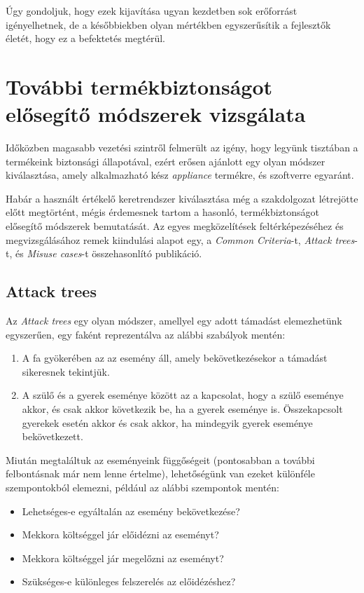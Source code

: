 Úgy gondoljuk, hogy ezek kijavítása ugyan kezdetben sok erőforrást igényelhetnek, de a későbbiekben
olyan mértékben egyszerűsítik a fejlesztők életét, hogy ez a befektetés megtérül.

\section{További termékbiztonságot elősegítő módszerek vizsgálata}

Időközben magasabb vezetési szintről felmerült az igény, hogy legyünk tisztában a termékeink
biztonsági állapotával, ezért erősen ajánlott egy olyan módszer kiválasztása, amely alkalmazható
kész \emph{appliance} termékre, és szoftverre egyaránt.

Habár a használt értékelő keretrendszer kiválasztása még a szakdolgozat létrejötte előtt megtörtént,
mégis érdemesnek tartom a hasonló, termékbiztonságot elősegítő módszerek bemutatását. Az egyes
megközelítések feltérképezéséhez és megvizsgálásához remek kiindulási alapot egy, a \emph{Common
Criteria}-t, \emph{Attack trees}-t, és \emph{Misuse cases}-t összehasonlító publikáció.
\cite{ThreeApproaches}

\subsection{Attack trees}

Az \emph{Attack trees}\cite{schneier1999attack} egy olyan módszer, amellyel egy adott támadást
elemezhetünk egyszerűen, egy faként reprezentálva az alábbi szabályok mentén:
\begin{enumerate}
    \item A fa gyökerében az az esemény áll, amely bekövetkezésekor a támadást sikeresnek tekintjük.
    \item A szülő és a gyerek eseménye között az a kapcsolat, hogy a szülő eseménye akkor, és csak
        akkor következik be, ha a gyerek eseménye is.  Összekapcsolt gyerekek esetén akkor és csak
        akkor, ha mindegyik gyerek eseménye bekövetkezett.
\end{enumerate}
Miután megtaláltuk az eseményeink függőségeit (pontosabban a további felbontásnak már nem lenne
értelme), lehetőségünk van ezeket különféle szempontokból elemezni, például az alábbi szempontok
mentén:
\begin{itemize}
    \item Lehetséges-e egyáltalán az esemény bekövetkezése?
    \item Mekkora költséggel jár előidézni az eseményt?
    \item Mekkora költséggel jár megelőzni az eseményt?
    \item Szükséges-e különleges felszerelés az előidézéshez?
\end{itemize}

